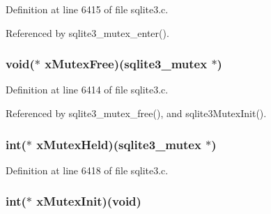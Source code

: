 Definition at line 6415 of file sqlite3.\+c.



Referenced by sqlite3\+\_\+mutex\+\_\+enter().

\hypertarget{structsqlite3__mutex__methods_a926165ded3bd55b79919e25404263d5c}{}
\subsubsection[{x\+Mutex\+Free}]{\setlength{\rightskip}{0pt plus 5cm}void($\ast$ x\+Mutex\+Free)({\bf sqlite3\+\_\+mutex} $\ast$)}\label{structsqlite3__mutex__methods_a926165ded3bd55b79919e25404263d5c}


Definition at line 6414 of file sqlite3.\+c.



Referenced by sqlite3\+\_\+mutex\+\_\+free(), and sqlite3\+Mutex\+Init().

\hypertarget{structsqlite3__mutex__methods_abfbaad1736d82afa5b689d754b17196b}{}
\subsubsection[{x\+Mutex\+Held}]{\setlength{\rightskip}{0pt plus 5cm}int($\ast$ x\+Mutex\+Held)({\bf sqlite3\+\_\+mutex} $\ast$)}\label{structsqlite3__mutex__methods_abfbaad1736d82afa5b689d754b17196b}


Definition at line 6418 of file sqlite3.\+c.

\hypertarget{structsqlite3__mutex__methods_aca650adcfdb8f1558549b53df3a90544}{}
\subsubsection[{x\+Mutex\+Init}]{\setlength{\rightskip}{0pt plus 5cm}int($\ast$ x\+Mutex\+Init)(void)}\label{structsqlite3__mutex__methods_aca650adcfdb8f1558549b53df3a90544}


